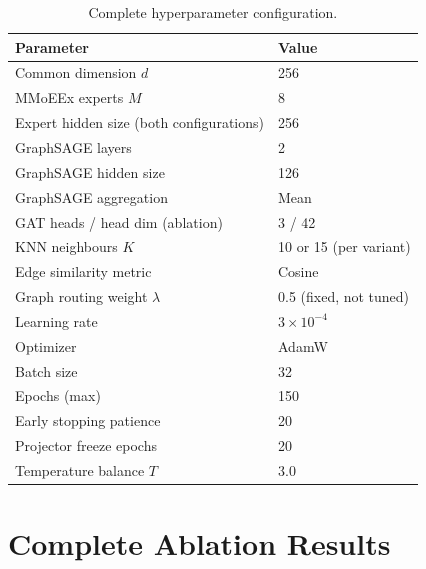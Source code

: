\documentclass[letterpaper]{article}
\begin{document}
\begin{table}[t]
\centering
\caption{Complete hyperparameter configuration.}
\label{tab:hparams}
\small
\begin{tabular}{ll}
\toprule
Parameter & Value \\
\midrule
Common dimension $d$ & 256 \\
MMoEEx experts $M$ & 8 \\
Expert hidden size (both configurations) & 256 \\
GraphSAGE layers & 2 \\
GraphSAGE hidden size & 126 \\
GraphSAGE aggregation & Mean \\
GAT heads / head dim (ablation) & 3 / 42 \\
KNN neighbours $K$ & 10 or 15 (per variant) \\
Edge similarity metric & Cosine \\
Graph routing weight $\lambda$ & 0.5 (fixed, not tuned) \\
Learning rate & $3 \times 10^{-4}$ \\
Optimizer & AdamW \\
Batch size & 32 \\
Epochs (max) & 150 \\
Early stopping patience & 20 \\
Projector freeze epochs & 20 \\
Temperature balance $T$ & 3.0 \\
\bottomrule
\end{tabular}
\end{table}

\section{Complete Ablation Results}
\end{document}
